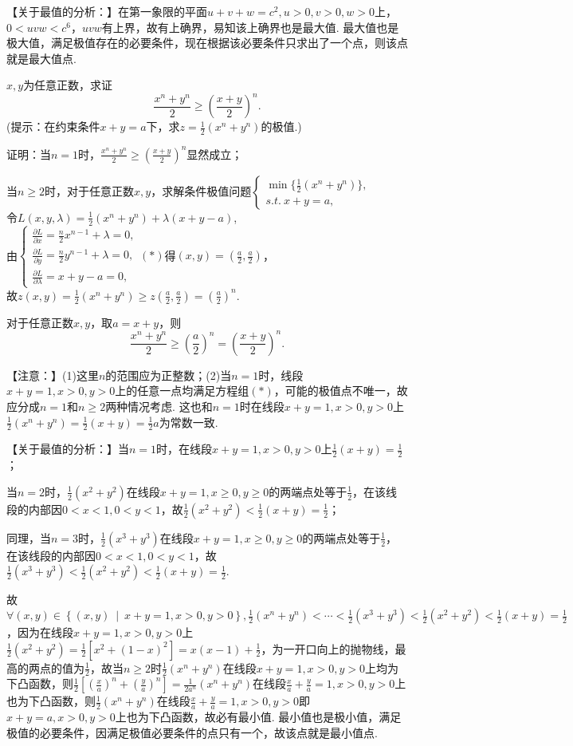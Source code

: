\documentclass[12pt,UTF8]{ctexart}
\newcommand\Set[2]{\left\{#1\ \middle\vert\ #2 \right\}}
\begin{document}
\begin{enumerate}
【关于最值的分析：】在第一象限的平面$u+v+w=c^2,u>0,v>0,w>0$上，$0<uvw<c^6$，$uvw$有上界，故有上确界，易知该上确界也是最大值. 最大值也是极大值，满足极值存在的必要条件，现在根据该必要条件只求出了一个点，则该点就是最大值点.

$x,y$为任意正数，求证
\[\frac{x^n+y^n}2\geqslant(\frac{x+y}2)^n.\]
(提示：在约束条件$x+y=a$下，求$z=\frac12(x^n+y^n)$的极值.)

证明：当$n=1$时，$\frac{x^n+y^n}2\geqslant(\frac{x+y}2)^n$显然成立；

当$n\geqslant2$时，对于任意正数$x,y$，求解条件极值问题$\begin{cases}
\min\{\frac12(x^n+y^n)\},\\
s.t.\ x+y=a,
\end{cases}$\\
令$L(x,y,\lambda)=\frac12(x^n+y^n)+\lambda(x+y-a)$,\\
由$\begin{cases}
\frac{\partial L}{\partial x}=\frac n2x^{n-1}+\lambda=0,\\
\frac{\partial L}{\partial y}=\frac n2y^{n-1}+\lambda=0,\\
\frac{\partial L}{\partial\lambda}=x+y-a=0,
\end{cases}(*)$得$(x,y)=(\frac a2,\frac a2)$，\\
故$z(x,y)=\frac12(x^n+y^n)\geqslant z(\frac a2,\frac a2)=(\frac a2)^n$.

对于任意正数$x,y$，取$a=x+y$，则
\[
\frac{x^n+y^n}2\geqslant(\frac a2)^n=(\frac{x+y}2)^n.
\]

【注意：】(1)这里$n$的范围应为正整数；(2)当$n=1$时，线段$x+y=1,x>0,y>0$上的任意一点均满足方程组$(*)$，可能的极值点不唯一，故应分成$n=1$和$n\geqslant2$两种情况考虑. 这也和$n=1$时在线段$x+y=1,x>0,y>0$上$\frac12(x^n+y^n)=\frac12(x+y)=\frac12a$为常数一致.

【关于最值的分析：】当$n=1$时，在线段$x+y=1,x>0,y>0$上$\frac12(x+y)=\frac 12$；

当$n=2$时，$\frac12(x^2+y^2)$在线段$x+y=1,x\geqslant0,y\geqslant0$的两端点处等于$\frac12$，在该线段的内部因$0<x<1,0<y<1$，故$\frac12(x^2+y^2)<\frac12(x+y)=\frac12$；

同理，当$n=3$时，$\frac12(x^3+y^3)$在线段$x+y=1,x\geqslant0,y\geqslant0$的两端点处等于$\frac12$，在该线段的内部因$0<x<1,0<y<1$，故$\frac12(x^3+y^3)<\frac12(x^2+y^2)<\frac12(x+y)=\frac12$.

故$\forall(x,y)\in\Set{(x,y)}{x+y=1,x>0,y>0},\frac12(x^n+y^n)<\cdots<\frac12(x^3+y^3)<\frac12(x^2+y^2)<\frac12(x+y)=\frac12$，因为在线段$x+y=1,x>0,y>0$上$\frac12(x^2+y^2)=\frac12[x^2+(1-x)^2]=x(x-1)+\frac12$，为一开口向上的抛物线，最高的两点的值为$\frac12$，故当$n\geqslant2$时$\frac12(x^n+y^n)$在线段$x+y=1,x>0,y>0$上均为下凸函数，则$\frac12[(\frac xa)^n+(\frac ya)^n]=\frac1{2a^n}(x^n+y^n)$在线段$\frac xa+\frac ya=1,x>0,y>0$上也为下凸函数，则$\frac12(x^n+y^n)$在线段$\frac xa+\frac ya=1,x>0,y>0$即$x+y=a,x>0,y>0$上也为下凸函数，故必有最小值. 最小值也是极小值，满足极值的必要条件，因满足极值必要条件的点只有一个，故该点就是最小值点.


\end{enumerate}
\end{document}
